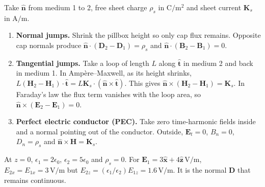 \documentclass[12pt,a4paper]{article}
\begin{document}
Take $\hat{\mathbf n}$ from medium 1 to 2, free sheet charge $\rho_s$ in $\mathrm{C/m^2}$ and sheet current $\mathbf K_s$ in $\mathrm{A/m}$.
\begin{enumerate}[leftmargin=*,itemsep=3pt]
\item \textbf{Normal jumps.} Shrink the pillbox height so only cap flux remains. Opposite cap normals produce $\hat{\mathbf n}\cdot(\mathbf D_2-\mathbf D_1)=\rho_s$ and $\hat{\mathbf n}\cdot(\mathbf B_2-\mathbf B_1)=0$.
\item \textbf{Tangential jumps.} Take a loop of length $L$ along $\hat{\mathbf t}$ in medium 2 and back in medium 1. In Amp\`ere--Maxwell, as its height shrinks, $L(\mathbf H_2-\mathbf H_1)\cdot\hat{\mathbf t}=L\mathbf K_s\cdot(\hat{\mathbf n}\times\hat{\mathbf t})$. This gives $\hat{\mathbf n}\times(\mathbf H_2-\mathbf H_1)=\mathbf K_s$. In Faraday's law the flux term vanishes with the loop area, so $\hat{\mathbf n}\times(\mathbf E_2-\mathbf E_1)=0$.
\item \textbf{Perfect electric conductor (PEC).} Take zero time-harmonic fields inside and a normal pointing out of the conductor. Outside, $\mathbf E_t=0$, $B_n=0$, $D_n=\rho_s$ and $\hat{\mathbf n}\times\mathbf H=\mathbf K_s$.
\end{enumerate}

\begin{tcolorbox}[examplebox,title={Normal and tangential electric fields}]
At $z=0$, $\epsilon_1=2\epsilon_0$, $\epsilon_2=5\epsilon_0$ and $\rho_s=0$. For $\mathbf E_1=3\hat{\mathbf x}+4\hat{\mathbf z}\,\mathrm{V/m}$, $E_{2x}=E_{1x}=3\,\mathrm{V/m}$ but $E_{2z}=(\epsilon_1/\epsilon_2)E_{1z}=1.6\,\mathrm{V/m}$. It is the normal $\mathbf D$ that remains continuous.
\end{tcolorbox}
\end{document}

